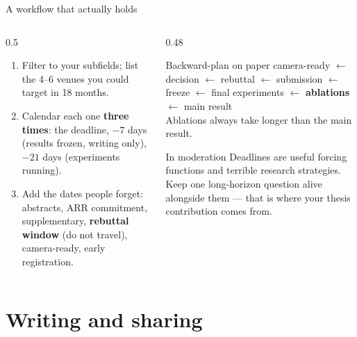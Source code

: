 \documentclass[aspectratio=169,11pt]{beamer}
\newcommand{\key}[1]{\textbf{\color{brand}#1}}
\begin{document}
\begin{frame}{A workflow that actually holds}
\begin{columns}[T]
\begin{column}{0.5\textwidth}
\begin{enumerate}
  \item Filter to your subfields; list the 4--6 venues you could target in 18
        months.
  \item Calendar each one \key{three times}: the deadline, $-7$ days (results
        frozen, writing only), $-21$ days (experiments running).
  \item Add the dates people forget: abstracts, ARR commitment,
        supplementary, \key{rebuttal window} (do not travel), camera-ready,
        early registration.
\end{enumerate}
\end{column}
\begin{column}{0.48\textwidth}
\begin{block}{Backward-plan on paper}
\footnotesize
camera-ready $\leftarrow$ decision $\leftarrow$ rebuttal $\leftarrow$
submission $\leftarrow$ freeze $\leftarrow$ final experiments $\leftarrow$
\textbf{ablations} $\leftarrow$ main result\\[4pt]
Ablations always take longer than the main result.
\end{block}
\begin{alertblock}{In moderation}
\footnotesize
Deadlines are useful forcing functions and terrible research strategies. Keep
one long-horizon question alive alongside them --- that is where your thesis
contribution comes from.
\end{alertblock}
\end{column}
\end{columns}
\end{frame}

\section{Writing and sharing}
\end{document}
